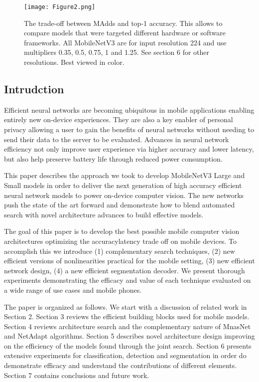 \begin{figure}[!htbp]
    \centering
    \texttt{[image: Figure2.png]}
    \caption{The trade-off between MAdds and top-1 accuracy. This allows to compare models that were targeted different hardware or
    software frameworks. All MobileNetV3 are for input resolution 224 and use multipliers 0.35, 0.5, 0.75, 1 and 1.25. See section 6
    for other resolutions. Best viewed in color.}
\end{figure}


\subsection{Intrudction}

Efficient neural networks are becoming ubiquitous in mobile applications enabling entirely new on-device experiences.
They are also a key enabler of personal privacy allowing a user to gain the benefits of neural networks without
needing to send their data to the server to be evaluated. Advances in neural network efficiency not only improve user
experience via higher accuracy and lower latency, but also help preserve battery life through reduced power consumption.

This paper describes the approach we took to develop MobileNetV3 Large and Small models in order to deliver
the next generation of high accuracy efficient neural network models to power on-device computer vision. The new
networks push the state of the art forward and demonstrate how to blend automated search with novel architecture advances
to build effective models.

The goal of this paper is to develop the best possible mobile computer vision architectures optimizing the accuracylatency
trade off on mobile devices. To accomplish this we introduce (1) complementary search techniques, (2) new efficient
versions of nonlinearities practical for the mobile setting, (3) new efficient network design, (4) a new efficient
segmentation decoder. We present thorough experiments demonstrating the efficacy and value of each technique evaluated
on a wide range of use cases and mobile phones.

The paper is organized as follows. We start with a discussion of related work in Section 2. Section 3 reviews the
efficient building blocks used for mobile models. Section 4 reviews architecture search and the complementary nature
of MnasNet and NetAdapt algorithms. Section 5 describes novel architecture design improving on the efficiency of the
models found through the joint search. Section 6 presents extensive experiments for classification, detection and segmentation
in order do demonstrate efficacy and understand the contributions of different elements. Section 7 contains
conclusions and future work.

